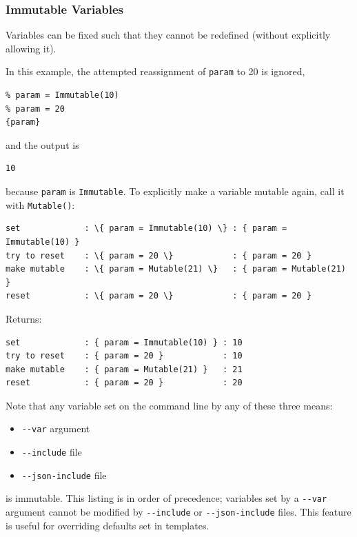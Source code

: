 {\subsubsection{Immutable Variables}\label{interfaces:immutable-variables}

Variables can be fixed such that they cannot be redefined (without
explicitly allowing it).

In this example, the attempted reassignment of \texttt{param} to 20 is
ignored,

\begin{verbatim}
% param = Immutable(10)
% param = 20 
{param}
\end{verbatim}

and the output is

\begin{verbatim}
10
\end{verbatim}

because \texttt{param} is \texttt{Immutable}. To explicitly make a
variable mutable again, call it with \texttt{Mutable()}:

\begin{verbatim}
set             : \{ param = Immutable(10) \} : { param = Immutable(10) }           
try to reset    : \{ param = 20 \}            : { param = 20 }          
make mutable    : \{ param = Mutable(21) \}   : { param = Mutable(21) } 
reset           : \{ param = 20 \}            : { param = 20 }         
\end{verbatim}

Returns:

\begin{verbatim}
set             : { param = Immutable(10) } : 10
try to reset    : { param = 20 }            : 10
make mutable    : { param = Mutable(21) }   : 21
reset           : { param = 20 }            : 20
\end{verbatim}

Note that any variable set on the command line by any of these three means:
\begin{itemize}
 \item \texttt{-\/-var} argument 
 \item \texttt{-\/-include} file
 \item \texttt{-\/-json-include} file
\end{itemize}
is immutable. This listing is in order of precedence; variables set by a 
\texttt{-\/-var} argument cannot be modified by \texttt{-\/-include}
or \texttt{-\/-json-include} files. This feature is useful for overriding
defaults set in templates.

}
